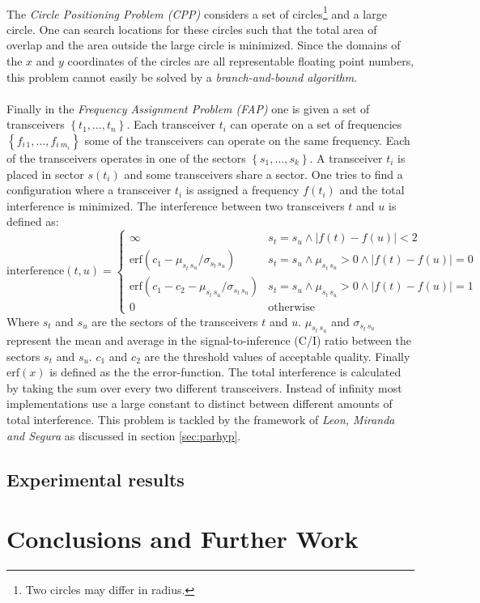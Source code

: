 \documentclass[a4paper,10pt]{article}
\newcommand{\secref}[1]{\ref{sec:#1}}
\newcommand{\abs}[1]{\ensuremath{\left| #1 \right|}}
\newcommand{\accl}[1]{\ensuremath{\left\{ #1 \right\}}}
\newcommand{\brak}[1]{\ensuremath{\left( #1 \right)}}
\newcommand{\fun}[2]{\ensuremath{#1\brak{#2}}}
\newcommand{\funm}[2]{\fun{\mbox{#1}}{#2}}
\newcommand{\guard}[1]{\ensuremath{\left\{\begin{array}{ll}#1\end{array}\right.}}
\theoremstyle{definition}
\begin{document}
\paragraph{}
The \emph{Circle Positioning Problem (CPP)}\cite{} considers a set of circles\footnote{Two circles may differ in radius.} and a large circle. One can search locations for these circles such that the total area of overlap and the area outside the large circle is minimized. Since the domains of the $x$ and $y$ coordinates of the circles are all representable floating point numbers, this problem cannot easily be solved by a \emph{branch-and-bound algorithm}.

\paragraph{}
Finally in the \emph{Frequency Assignment Problem (FAP)}\cite{} one is given a set of transceivers $\accl{t_1,\ldots,t_n}$. Each transceiver $t_i$ can operate on a set of frequencies $\accl{f_{i\,1},\ldots,f_{i\ m_i}}$ some of the transceivers can operate on the same frequency. Each of the transceivers operates in one of the sectors $\accl{s_1,\ldots,s_k}$. A transceiver $t_i$ is placed in sector \fun{s}{t_i} and some transceivers share a sector. One tries to find a configuration where a transceiver $t_i$ is assigned a frequency $\fun{f}{t_i}$ and the total interference is minimized. The interference between two transceivers $t$ and $u$ is defined as:
\begin{equation}
\funm{interference}{t,u}=\guard{
\infty&s_t=s_u\wedge\abs{\fun{f}{t}-\fun{f}{u}}<2\\
\funm{erf}{c_1-\mu_{s_t\,s_u}/\sigma_{s_t\,s_u}}&s_t=s_u\wedge\mu_{s_t\,s_u}>0\wedge\abs{\fun{f}{t}-\fun{f}{u}}=0\\
\funm{erf}{c_1-c_2-\mu_{s_t\,s_u}/\sigma_{s_t\,s_u}}&s_t=s_u\wedge\mu_{s_t\,s_u}>0\wedge\abs{\fun{f}{t}-\fun{f}{u}}=1\\
0&\mbox{otherwise}
}
\end{equation}
Where $s_t$ and $s_u$ are the sectors of the transceivers $t$ and $u$. $\mu_{s_t\,s_u}$ and $\sigma_{s_t\,s_u}$ represent the mean and average in the signal-to-inference (C/I) ratio between the sectors $s_t$ and $s_u$. $c_1$ and $c_2$ are the threshold values of acceptable quality. Finally $\funm{erf}{x}$ is defined as the the error-function. The total interference is calculated by taking the sum over every two different transceivers. Instead of infinity most implementations use a large constant to distinct between different amounts of total interference. This problem is tackled by the framework of \emph{Leon, Miranda and Segura} as discussed in section \secref{parhyp}.

\subsection{Experimental results}


\section{Conclusions and Further Work}



\end{document}
